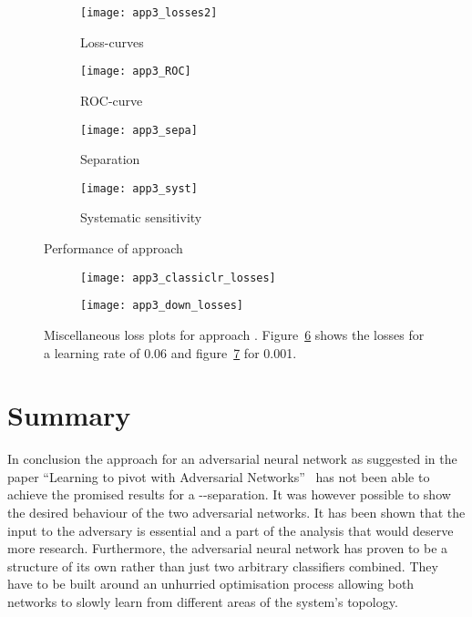 \begin{figure}[htbp]
    \centering
    \begin{subfigure}[b]{0.45\textwidth}
        \texttt{[image: app3\_losses2]}
        \caption{Loss-curves}
        \label{fig:app3:losses}
    \end{subfigure}
\quad
    \begin{subfigure}[b]{0.45\textwidth}
        \texttt{[image: app3\_ROC]}
        \caption{ROC-curve}
        \label{fig:app3:ROC}
    \end{subfigure}

    \begin{subfigure}[b]{0.45\textwidth}
		\texttt{[image: app3\_sepa]}
		\caption{Separation}
		\label{fig:app3:sepa}
	\end{subfigure}
\quad
	\begin{subfigure}[b]{0.45\textwidth}
		\texttt{[image: app3\_syst]}
		\caption{Systematic sensitivity}
		\label{fig:app3:syst}
	\end{subfigure}
    \caption{Performance of approach }
	\label{fig:app3}
\end{figure}

\begin{figure}[htbp]
    \centering
    \begin{subfigure}[b]{0.45\textwidth}
        \texttt{[image: app3\_classiclr\_losses]}
        \caption{}
        \label{fig:app3:classiclr:losses}
    \end{subfigure}
\quad
    \begin{subfigure}[b]{0.45\textwidth}
        \texttt{[image: app3\_down\_losses]}
        \caption{}
        \label{fig:app3:down:losses}
    \end{subfigure}
    \caption{Miscellaneous loss plots for approach . Figure~\ref{fig:app3:classiclr:losses} shows the losses for a learning rate of \num{0.06} and figure~\ref{fig:app3:down:losses} for \num{0.001}.}
	\label{fig:app3:misc}
\end{figure}
\section{Summary}

In conclusion the approach for an adversarial neural network as suggested in the paper \enquote{Learning to pivot with Adversarial Networks}~\cite{Louppe:2016ylz} has not been able to achieve the promised results for a \tW-\ttbar-separation. It was however possible to show the desired behaviour of the two adversarial networks. It has been shown that the input to the adversary is essential and a part of the analysis that would deserve more research. Furthermore, the adversarial neural network has proven to be a structure of its own rather than just two arbitrary classifiers combined. They have to be built around an unhurried optimisation process allowing both networks to slowly learn from different areas of the system's topology.
